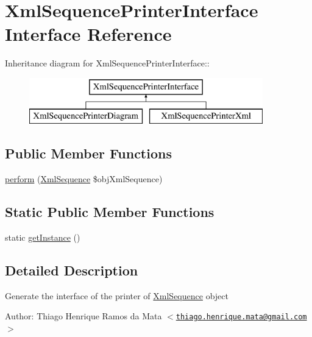 \hypertarget{interface_xml_sequence_printer_interface}{
\section{XmlSequencePrinterInterface Interface Reference}
\label{interface_xml_sequence_printer_interface}
}
Inheritance diagram for XmlSequencePrinterInterface::\begin{figure}[H]
\begin{center}
\leavevmode
\includegraphics[height=2cm]{interface_xml_sequence_printer_interface}
\end{center}
\end{figure}
\subsection*{Public Member Functions}
\begin{CompactItemize}
\item 
\hyperlink{interface_xml_sequence_printer_interface_7a8a4630e9f25847da0a6de87a5ab7e0}{perform} (\hyperlink{class_xml_sequence}{XmlSequence} \$objXmlSequence)
\end{CompactItemize}
\subsection*{Static Public Member Functions}
\begin{CompactItemize}
\item 
static \hyperlink{interface_xml_sequence_printer_interface_c93fbec81f07e5d15f80db907e63dc10}{getInstance} ()
\end{CompactItemize}


\subsection{Detailed Description}
Generate the interface of the printer of \hyperlink{class_xml_sequence}{XmlSequence} object \begin{Desc}
\item[Author:]Thiago Henrique Ramos da Mata $<$\href{mailto:thiago.henrique.mata@gmail.com}{\tt thiago.henrique.mata@gmail.com}$>$ \end{Desc}


